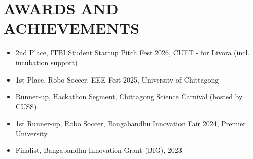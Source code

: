 \documentclass[10.5pt,a4paper]{article}
\newenvironment{tightitemize}{
  \begin{itemize}[leftmargin=15pt, itemsep=1pt, parsep=0pt, topsep=2pt]
}{
  \end{itemize}
}
\begin{document}
\section*{AWARDS AND ACHIEVEMENTS}
\begin{tightitemize}
  \item 2nd Place, ITBI Student Startup Pitch Fest 2026, CUET - for Livora (incl. incubation support)
  \item 1st Place, Robo Soccer, EEE Fest 2025, University of Chittagong
  \item Runner-up, Hackathon Segment, Chittagong Science Carnival (hosted by CUSS)
  \item 1st Runner-up, Robo Soccer, Bangabandhu Innovation Fair 2024, Premier University
  \item Finalist, Bangabandhu Innovation Grant (BIG), 2023
\end{tightitemize}
\end{document}
